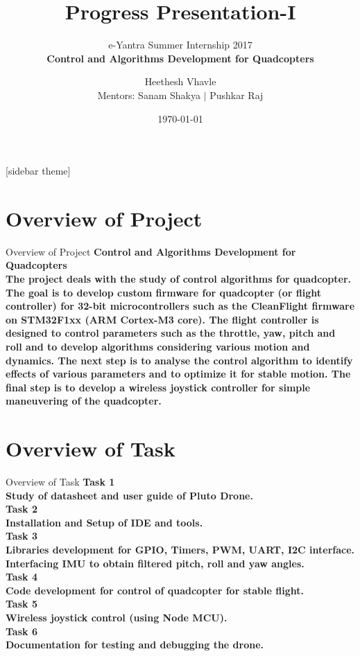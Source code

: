 \documentclass[10pt, a4paper]{beamer}
\begin{document}
	\title{Progress Presentation-I}
	\subtitle{e-Yantra Summer Internship 2017 \\ \bfseries Control and Algorithms Development for Quadcopters}
	\author{Heethesh Vhavle\\
	Mentors: Sanam Shakya $|$ Pushkar Raj}
	\date{\today}
	\frame{\titlepage}

[sidebar theme]
\section{Overview of Project}
\begin{frame}{Overview of Project}
\bfseries Control and Algorithms Development for Quadcopters \\
\hfill \break
\mdseries The project deals with the study of control algorithms for quadcopter. The goal is to develop custom firmware for quadcopter (or flight controller) for 32-bit microcontrollers such as the CleanFlight firmware on STM32F1xx (ARM Cortex-M3 core). The flight controller is designed to control parameters such as the throttle, yaw, pitch and roll and to develop algorithms considering various motion and dynamics. The next step is to analyse the control algorithm to identify effects of various parameters and to optimize it for stable motion. The final step is to develop a wireless joystick controller for simple maneuvering of the quadcopter. 	
\end{frame}

\section{Overview of Task}
\begin{frame}{Overview of Task}
\bfseries Task 1\\ \mdseries Study of datasheet and user guide of Pluto Drone.\\ \hfill \break
\bfseries Task 2\\ \mdseries Installation and Setup of IDE and tools.\\ \hfill \break
\bfseries Task 3\\ \mdseries Libraries development for GPIO, Timers, PWM, UART, I2C interface.\\
Interfacing IMU to obtain filtered pitch, roll and yaw angles.\\ \hfill \break
\bfseries Task 4\\ \mdseries Code development for control of quadcopter for stable flight.\\ \hfill \break
\bfseries Task 5\\ \mdseries Wireless joystick control (using Node MCU).\\ \hfill \break
\bfseries Task 6\\ \mdseries Documentation for testing and debugging the drone.\\ \hfill \break
\end{frame}
\end{document}

